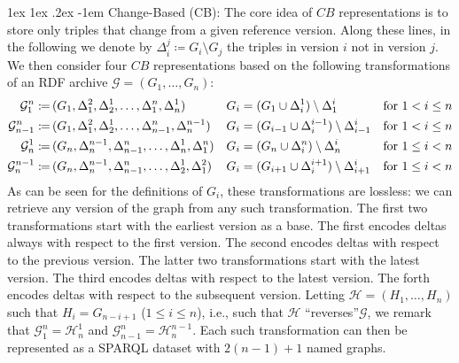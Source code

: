 \documentclass{llncs}
\makeatletter
\renewcommand\paragraph{\@startsection{paragraph}{4}{\z@}%
	{1ex \@plus1ex \@minus.2ex}%
	{-1em}%
	{\normalfont\normalsize\itshape}}
\newcommand{\da}{\ensuremath{:\nolinebreak\mkern-1.2mu\nolinebreak=}}
\makeatother
\begin{document}
\paragraph{Change-Based (CB):} The core idea of $CB$ representations is to store only triples that change from a given reference version. Along these lines, in the following we denote by $\Delta_{i}^j \coloneqq G_i \setminus G_j$ the triples in version $i$ not in version $j$. We then consider four $CB$ representations based on the following transformations of an RDF archive $\mathcal{G} = (G_1,\ldots,G_n)$:
%
{\footnotesize
\begin{align*}
\mathcal{G}^n_1 \da\,& (G_1,\Delta_1^2,\Delta_2^1,\ldots,\Delta_1^n,\Delta_n^1) & G_i & = (G_1 \cup \Delta_i^1) \setminus \Delta_1^i & \text{for }1 < i \leq n\\
\mathcal{G}^n_{n-1} \da\,& (G_1,\Delta_1^2,\Delta_2^1,\ldots,\Delta_{n-1}^n,\Delta_n^{n-1}) & G_i & = (G_{i-1} \cup \Delta_i^{i-1}) \setminus \Delta_{i-1}^i & \text{for }1 < i \leq n \\
\mathcal{G}^1_n \da\,& (G_n,\Delta_n^{n-1},\Delta_{n-1}^n,\ldots,\Delta_n^1,\Delta_1^n) & G_i & = (G_n \cup \Delta_i^n) \setminus \Delta_n^i & \text{for }1 \leq i < n \\
\mathcal{G}^{n-1}_n \da\,& (G_n,\Delta_n^{n-1},\Delta_{n-1}^n,\ldots,\Delta_2^1,\Delta_1^2) & G_i & = (G_{i+1} \cup \Delta_i^{i+1}) \setminus \Delta_{i+1}^i & \text{for }1 \leq i < n
\end{align*}%
}%
%
As can be seen for the definitions of $G_i$, these transformations are lossless: we can retrieve any version of the graph from any such transformation. The first two transformations start with the earliest version as a base. The first encodes deltas always with respect to the first version. The second encodes deltas with respect to the previous version. The latter two transformations start with the latest version. The third encodes deltas with respect to the latest version. The forth encodes deltas with respect to the subsequent version. Letting $\mathcal{H} = (H_1,\ldots,H_n)$ such that $H_i = G_{n-i+1}$ ($1 \leq i \leq n$), i.e., such that $\mathcal{H}$ ``reverses''$\mathcal{G}$, we remark that $\mathcal{G}^n_1 = \mathcal{H}^1_n$ and $\mathcal{G}^n_{n-1} = \mathcal{H}^{n-1}_n$. Each such transformation can then be represented as a SPARQL dataset with $2(n-1)+1$ named graphs.
\end{document}
